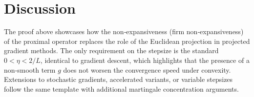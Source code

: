 \documentclass{article}
\begin{document}
\section*{Discussion}
The proof above showcases how the non‑expansiveness (firm non‑expansiveness) of the proximal operator replaces the role of the Euclidean projection in projected gradient methods.  The only requirement on the stepsize is the standard $0<\eta<2/L$, identical to gradient descent, which highlights that the presence of a non‑smooth term $g$ does not worsen the convergence speed under convexity.  Extensions to stochastic gradients, accelerated variants, or variable stepsizes follow the same template with additional martingale concentration arguments.
\end{document}
